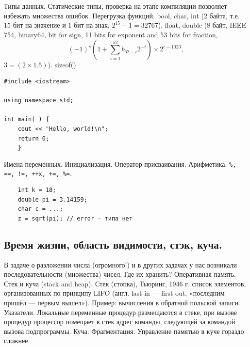 \documentclass{book}
\begin{document}
Типы данных. Статические типы, проверка на этапе компиляции позволяет избежать множества ошибок.
Перегрузка функций.
bool, char, int (2 байта, т.е. 15 бит на значение и 1 бит на знак, $2^{15} - 1 = 32767$),
float, double (8 байт, IEEE 754, binary64, bit for sign, 11 bits for exponent and 53 bits for
fraction,
\begin{equation}
    (-1)^s \left(1 + \sum_{i = 1}^{52} b_{52 - i} 2^{-i} \right) \times 2^{e - 1023},
\end{equation}
 $3 = (2 \times 1.5)$). sizeof()

\begin{verbatim}
#include <iostream> 

using namespace std;

int main( ) { 
    cout << "Hello, world!\n"; 
    return 0; 
    }
\end{verbatim}

Имена переменных. Инициализация. Оператор присваивания. Арифметика.
\texttt{\%, ==, !=, ++x, +=, \%=}.
\begin{verbatim}
    int k = 18;
    double pi = 3.14159;
    char c = ...;
    z = sqrt(pi); // error - типа нет
\end{verbatim}

\subsection{Время жизни, область видимости, стэк, куча.}

В задаче о разложении числа (огромного!) и в других задачах у нас возникали последовательности
(множества) чисел. Где их хранить? Оперативная память. Стек и
куча (stack and heap). Стек (стопка), Тьюринг, 1946 г. список элементов, организованных по принципу LIFO
(англ. last in — first out, «последним пришёл — первым вышел»). Пример: вычисления в обратной
польской записи. Указатели. Локальные переменные
процедур размещаются в стеке, при вызове процедур процессор помещает в стек адрес команды,
следующей за командой вызова подпрограммы. Куча. Фрагментация. Управление памятью в куче гораздо сложнее.
\end{document}
